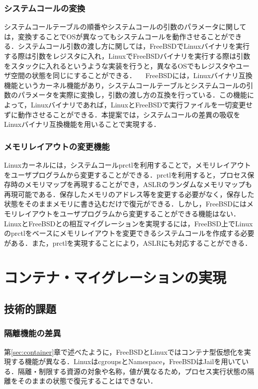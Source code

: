 \documentclass[11pt]{jarticle}
\begin{document}
\subsubsection{システムコールの変換}
システムコールテーブルの順番やシステムコールの引数のパラメータに関しては，変換することでOSが異なってもシステムコールを動作させることができる．システムコール引数の渡し方に関しては，FreeBSDでLinuxバイナリを実行する際は引数をレジスタに入れ，LinuxでFreeBSDバイナリを実行する際は引数をスタックに入れるというような実装を行うと，異なるOSでもレジスタやユーザ空間の状態を同じにすることができる．
　FreeBSDには，Linuxバイナリ互換機能\cite{linux-emu}というカーネル機能があり，システムコールテーブルとシステムコールの引数のパラメータを実際に変換し，引数の渡し方の互換を行っている．この機能によって，Linuxバイナリであれば，LinuxとFreeBSDで実行ファイルを一切変更せずに動作させることができる．本提案では，システムコールの差異の吸収をLinuxバイナリ互換機能を用いることで実現する．

\subsubsection{メモリレイアウトの変更機能}
Linuxカーネルには，システムコールprctlを利用することで，メモリレイアウトをユーザプログラムから変更することができる．prctlを利用すると，プロセス保存時のメモリマップを再現することができ，ASLRのランダムなメモリマップも再現可能である．保存したメモリのアドレス等を変更する必要がなく，保存した状態をそのままメモリに書き込むだけで復元ができる．しかし，FreeBSDにはメモリレイアウトをユーザプログラムから変更することができる機能はない．LinuxとFreeBSDとの相互マイグレーションを実現するには，FreeBSD上でLinuxのprctlをベースにメモリレイアウトを変更できるシステムコールを作成する必要がある．また，prctlを実現することにより，ASLRにも対応することができる．

\section{コンテナ・マイグレーションの実現}
\label{sec:CM}
\subsection{技術的課題}
\subsubsection{隔離機能の差異}
第\ref{sec:container}章で述べたように，FreeBSDとLinuxではコンテナ型仮想化を実現する機能が異なる．LinuxはcgroupsとNamespace，FreeBSDはJailを用いている．隔離・制限する資源の対象や名称，値が異なるため，プロセス実行状態の隔離をそのままの状態で復元することはできない．
\end{document}
